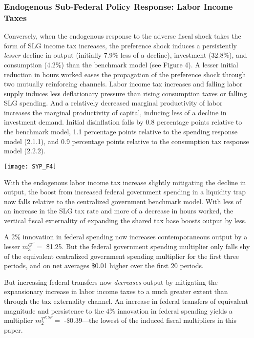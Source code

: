\documentclass[12pt,letterpaper]{article}
\begin{document}
\subsubsection{Endogenous Sub-Federal Policy Response: Labor Income Taxes}
Conversely, when the endogenous response to the adverse fiscal shock takes the form of SLG income tax increases, the preference shock induces a persistently \textit{lesser} decline in output (initially 7.9\% less of a decline), investment (32.8\%), and consumption (4.2\%) than the benchmark model (see Figure 4). A lesser initial reduction in hours worked eases the propagation of the preference shock through two mutually reinforcing channels. Labor income tax increases and falling labor supply induces less deflationary pressure than rising consumption taxes or falling SLG spending. And a relatively decreased marginal productivity of labor increases the marginal productivity of capital, inducing less of a decline in investment demand. Initial disinflation falls by 0.8 percentage points relative to the benchmark model, 1.1 percentage points relative to the spending response model (2.1.1), and 0.9 percentage points relative to the consumption tax response model (2.2.2).


\begin{center}
\texttt{[image: SYP\_F4]}
\end{center}

With the endogenous labor income tax increase slightly mitigating the decline in output, the boost from increased federal government spending in a liquidity trap now falls relative to the centralized government benchmark model. With less of an increase in the SLG tax rate and more of a decrease in hours worked, the vertical fiscal externality of expanding the shared tax base boosts output by less. 

A 2\% innovation in federal spending now increases contemporaneous output by a lesser $m^{G^F}_3 = $ \$1.25. But the federal government spending multiplier only falls shy of the equivalent centralized government spending multiplier for the first three periods, and on net averages \$0.01 higher over the first 20 periods. 

But increasing federal transfers now \textit{decreases} output by mitigating the expansionary increase in labor income taxes to a much greater extent than through the tax externality channel. An increase in federal transfers of equivalent magnitude and persistence to the 4\% innovation in federal spending yields a multiplier $m^{T^{F,SF}}_2 = $ -\$0.39---the lowest of the induced fiscal multipliers in this paper. 
\end{document}
